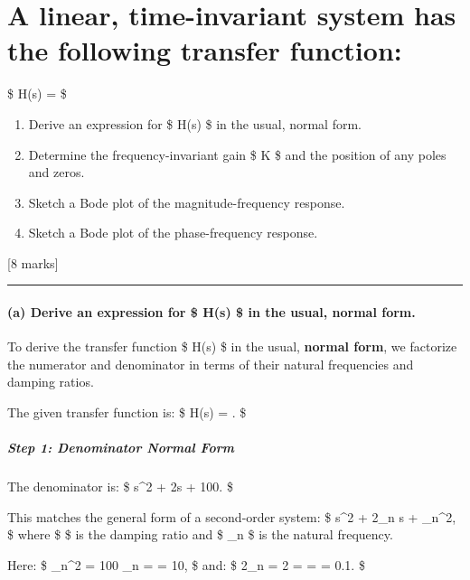 \documentclass[11pt]{article}
\begin{document}
    

    \section{A linear, time-invariant system has the following transfer
function:}\label{a-linear-time-invariant-system-has-the-following-transfer-function}

\$ H(s) =  \$

\begin{enumerate}
\def\labelenumi{(\alph{enumi})}
\item
  Derive an expression for \$ H(s) \$ in the usual, normal form.
\item
  Determine the frequency-invariant gain \$ K \$ and the position of any
  poles and zeros.
\item
  Sketch a Bode plot of the magnitude-frequency response.
\item
  Sketch a Bode plot of the phase-frequency response.
\end{enumerate}

{[}8 marks{]}

    \begin{center}\rule{0.5\linewidth}{0.5pt}\end{center}

\paragraph{(a) Derive an expression for \$ H(s) \$ in the usual, normal
form.}\label{a-derive-an-expression-for-hs-in-the-usual-normal-form.}

To derive the transfer function \$ H(s) \$ in the usual, \textbf{normal
form}, we factorize the numerator and denominator in terms of their
natural frequencies and damping ratios.

The given transfer function is: \$ H(s) =
. \$

\subparagraph{Step 1: Denominator Normal
Form}\label{step-1-denominator-normal-form}

The denominator is: \$ s\^{}2 + 2s + 100. \$

This matches the general form of a second-order system: \$ s\^{}2 +
2\zeta\omega\_n s + \omega\_n\^{}2, \$ where \$ \zeta \$ is the damping
ratio and \$ \omega\_n \$ is the natural frequency.

Here: \$ \omega\_n\^{}2 = 100 \quad \Rightarrow \quad \omega\_n =
 = 10, \$ and: \$ 2\zeta\omega\_n = 2
\quad \Rightarrow \quad \zeta =  =  =
0.1. \$
\end{document}
